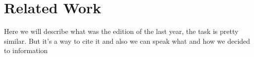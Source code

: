 \section{Related Work}
Here we will describe what was the edition of the last year, the task is pretty similar. But it's a way to cite it and also we can speak what and how we decided to information
